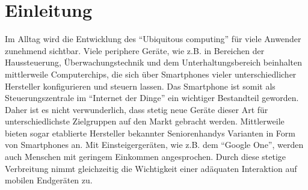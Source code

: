 \documentclass[a4paper,12pt,bibliography=totoc]{scrreprt}%
\begin{document}
\chapter{Einleitung}
Im Alltag wird die Entwicklung des "`Ubiquitous computing"' für viele Anwender zunehmend sichtbar. Viele periphere Geräte, wie z.B. in Bereichen der Haussteuerung, Überwachungstechnik und dem Unterhaltungsbereich beinhalten mittlerweile Computerchips, die sich über Smartphones vieler unterschiedlicher Hersteller konfigurieren und steuern lassen. Das Smartphone ist somit als Steuerungszentrale im "`Internet der Dinge"' ein wichtiger Bestandteil geworden.\\
Daher ist es nicht verwunderlich, dass stetig neue Geräte dieser Art für unterschiedlichste Zielgruppen auf den Markt gebracht werden. Mittlerweile bieten sogar etablierte Hersteller bekannter Seniorenhandys Varianten in Form von Smartphones an.\cite{dorol} Mit Einsteigergeräten, wie z.B. dem "`Google One"'\cite{gOne}, werden auch Menschen mit geringem Einkommen angesprochen. Durch diese stetige Verbreitung nimmt gleichzeitig die Wichtigkeit einer adäquaten Interaktion auf mobilen Endgeräten zu.
\end{document}
